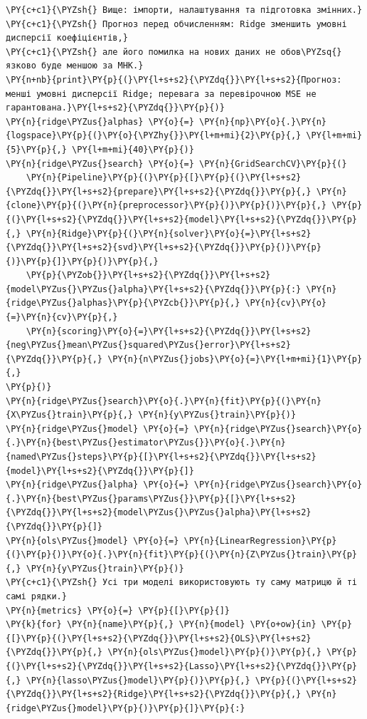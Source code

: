 \begin{Verbatim}[commandchars=\\\{\}]
\PY{c+c1}{\PYZsh{} Вище: імпорти, налаштування та підготовка змінних.}
\PY{c+c1}{\PYZsh{} Прогноз перед обчисленням: Ridge зменшить умовні дисперсії коефіцієнтів,}
\PY{c+c1}{\PYZsh{} але його помилка на нових даних не обов\PYZsq{}язково буде меншою за МНК.}
\PY{n+nb}{print}\PY{p}{(}\PY{l+s+s2}{\PYZdq{}}\PY{l+s+s2}{Прогноз: менші умовні дисперсії Ridge; перевага за перевірочною MSE не гарантована.}\PY{l+s+s2}{\PYZdq{}}\PY{p}{)}
\PY{n}{ridge\PYZus{}alphas} \PY{o}{=} \PY{n}{np}\PY{o}{.}\PY{n}{logspace}\PY{p}{(}\PY{o}{\PYZhy{}}\PY{l+m+mi}{2}\PY{p}{,} \PY{l+m+mi}{5}\PY{p}{,} \PY{l+m+mi}{40}\PY{p}{)}
\PY{n}{ridge\PYZus{}search} \PY{o}{=} \PY{n}{GridSearchCV}\PY{p}{(}
    \PY{n}{Pipeline}\PY{p}{(}\PY{p}{[}\PY{p}{(}\PY{l+s+s2}{\PYZdq{}}\PY{l+s+s2}{prepare}\PY{l+s+s2}{\PYZdq{}}\PY{p}{,} \PY{n}{clone}\PY{p}{(}\PY{n}{preprocessor}\PY{p}{)}\PY{p}{)}\PY{p}{,} \PY{p}{(}\PY{l+s+s2}{\PYZdq{}}\PY{l+s+s2}{model}\PY{l+s+s2}{\PYZdq{}}\PY{p}{,} \PY{n}{Ridge}\PY{p}{(}\PY{n}{solver}\PY{o}{=}\PY{l+s+s2}{\PYZdq{}}\PY{l+s+s2}{svd}\PY{l+s+s2}{\PYZdq{}}\PY{p}{)}\PY{p}{)}\PY{p}{]}\PY{p}{)}\PY{p}{,}
    \PY{p}{\PYZob{}}\PY{l+s+s2}{\PYZdq{}}\PY{l+s+s2}{model\PYZus{}\PYZus{}alpha}\PY{l+s+s2}{\PYZdq{}}\PY{p}{:} \PY{n}{ridge\PYZus{}alphas}\PY{p}{\PYZcb{}}\PY{p}{,} \PY{n}{cv}\PY{o}{=}\PY{n}{cv}\PY{p}{,}
    \PY{n}{scoring}\PY{o}{=}\PY{l+s+s2}{\PYZdq{}}\PY{l+s+s2}{neg\PYZus{}mean\PYZus{}squared\PYZus{}error}\PY{l+s+s2}{\PYZdq{}}\PY{p}{,} \PY{n}{n\PYZus{}jobs}\PY{o}{=}\PY{l+m+mi}{1}\PY{p}{,}
\PY{p}{)}
\PY{n}{ridge\PYZus{}search}\PY{o}{.}\PY{n}{fit}\PY{p}{(}\PY{n}{X\PYZus{}train}\PY{p}{,} \PY{n}{y\PYZus{}train}\PY{p}{)}
\PY{n}{ridge\PYZus{}model} \PY{o}{=} \PY{n}{ridge\PYZus{}search}\PY{o}{.}\PY{n}{best\PYZus{}estimator\PYZus{}}\PY{o}{.}\PY{n}{named\PYZus{}steps}\PY{p}{[}\PY{l+s+s2}{\PYZdq{}}\PY{l+s+s2}{model}\PY{l+s+s2}{\PYZdq{}}\PY{p}{]}
\PY{n}{ridge\PYZus{}alpha} \PY{o}{=} \PY{n}{ridge\PYZus{}search}\PY{o}{.}\PY{n}{best\PYZus{}params\PYZus{}}\PY{p}{[}\PY{l+s+s2}{\PYZdq{}}\PY{l+s+s2}{model\PYZus{}\PYZus{}alpha}\PY{l+s+s2}{\PYZdq{}}\PY{p}{]}
\PY{n}{ols\PYZus{}model} \PY{o}{=} \PY{n}{LinearRegression}\PY{p}{(}\PY{p}{)}\PY{o}{.}\PY{n}{fit}\PY{p}{(}\PY{n}{Z\PYZus{}train}\PY{p}{,} \PY{n}{y\PYZus{}train}\PY{p}{)}
\PY{c+c1}{\PYZsh{} Усі три моделі використовують ту саму матрицю й ті самі рядки.}
\PY{n}{metrics} \PY{o}{=} \PY{p}{[}\PY{p}{]}
\PY{k}{for} \PY{n}{name}\PY{p}{,} \PY{n}{model} \PY{o+ow}{in} \PY{p}{[}\PY{p}{(}\PY{l+s+s2}{\PYZdq{}}\PY{l+s+s2}{OLS}\PY{l+s+s2}{\PYZdq{}}\PY{p}{,} \PY{n}{ols\PYZus{}model}\PY{p}{)}\PY{p}{,} \PY{p}{(}\PY{l+s+s2}{\PYZdq{}}\PY{l+s+s2}{Lasso}\PY{l+s+s2}{\PYZdq{}}\PY{p}{,} \PY{n}{lasso\PYZus{}model}\PY{p}{)}\PY{p}{,} \PY{p}{(}\PY{l+s+s2}{\PYZdq{}}\PY{l+s+s2}{Ridge}\PY{l+s+s2}{\PYZdq{}}\PY{p}{,} \PY{n}{ridge\PYZus{}model}\PY{p}{)}\PY{p}{]}\PY{p}{:}

\end{Verbatim}
